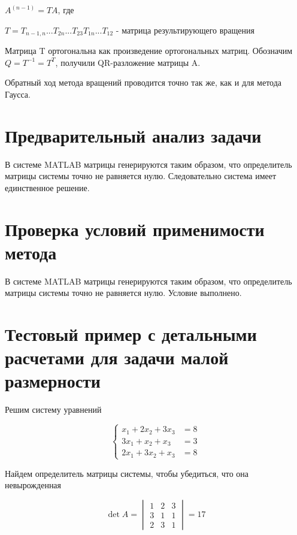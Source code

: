 \begin{math}
	A^{(n-1)}=TA
\end{math},
где 

\begin{math}
	T=T_{n-1,n}...T_{2n}...T_{23}T_{1n}...T_{12}
\end{math} 
- матрица результирующего вращения 

Матрица T ортогональна как произведение ортогональных матриц. Обозначим 
\begin{math}
	Q=T^{-1}=T^{T}
\end{math},
получили QR-разложение матрицы A.

Обратный ход метода вращений проводится точно так же, как и для метода Гаусса.

\section{Предварительный анализ задачи}

В системе MATLAB матрицы генерируются таким образом, что определитель матрицы системы точно не равняется нулю. Следовательно система имеет единственное решение. 

\section{Проверка условий применимости метода}

В системе MATLAB матрицы генерируются таким образом, что определитель матрицы системы точно не равняется нулю. Условие выполнено.

\section{Тестовый пример с детальными расчетами для задачи малой размерности}

Решим систему уравнений

\begin{equation*}
	\begin{cases}
		x_{1}+2x_{2}+3x_{3}&=8\\
		3x_{1}+x_{2}+x_{3}&=3\\
		2x_{1}+3x_{2}+x_{3}&=8
	\end{cases}
\end{equation*}

Найдем определитель матрицы системы, чтобы убедиться, что она невырожденная 

\begin{equation*}
	\det A =
	\begin{vmatrix}
		1 & 2 & 3\\
		3 & 1 & 1\\
		2 & 3 & 1
	\end{vmatrix}
	= 17
\end{equation*}

